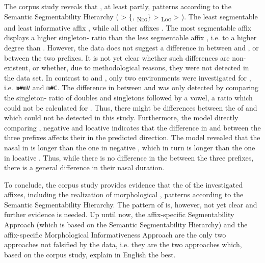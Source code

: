 The corpus study reveals that , at least partly, patterns according to the Semantic Segmentability Hierarchy ( > \{, \textsubscript{\textsc{Neg}}\} >  \textsubscript{\textsc{Loc}} > ). %
The least segmentable and least informative affix  , while all other affixes . The most segmentable affix  displays a higher singleton- ratio than the less segmentable affix , i.e.   to a higher degree than . However, the data does not suggest a difference in  between  and , or between the two prefixes.
 It is not yet clear whether such differences are non-existent, or whether, due to methodological reasons, they were not detected in the data set. 
  In contrast to  and , only two environments were investigated for , i.e. \texttt{m\#mV} and \texttt{m\#C}. The difference in  between  and  was only detected by comparing the singleton- ratio of doubles and singletons followed by a vowel, a ratio which could not be calculated for . Thus, there might be differences between the  of  and  which could not be detected in this study.
Furthermore, the model directly comparing , negative  and locative  indicates that the difference in  and  between the three prefixes affects their  in the predicted direction. The model revealed that the nasal in  is longer than the one in negative , which in turn is longer than the one in locative . Thus, while there is no difference in the  between the three prefixes, there is a general difference in  their nasal duration.
 
 To conclude, the corpus study provides evidence that the  of the investigated affixes, including the realization of morphological , patterns according to the Semantic Segmentability Hierarchy. The pattern of  is, however, not yet clear and further evidence is needed. 
 Up until now, the affix-specific Segmentability Approach (which is based on the Semantic Segmentability Hierarchy) and the affix-specific Morphological Informativeness Approach are the only two approaches not falsified by the data, i.e. they are the two approaches which, based on the corpus study, explain  in English  the best.


